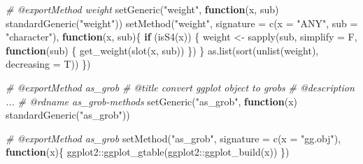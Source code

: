 \documentclass[
]{article}
\newenvironment{Shaded}{\begin{snugshade}}{\end{snugshade}}
\newcommand{\AttributeTok}[1]{\textcolor[rgb]{0.77,0.63,0.00}{#1}}
\newcommand{\CommentTok}[1]{\textcolor[rgb]{0.56,0.35,0.01}{\textit{#1}}}
\newcommand{\ControlFlowTok}[1]{\textcolor[rgb]{0.13,0.29,0.53}{\textbf{#1}}}
\newcommand{\FunctionTok}[1]{\textcolor[rgb]{0.00,0.00,0.00}{#1}}
\newcommand{\NormalTok}[1]{#1}
\newcommand{\OtherTok}[1]{\textcolor[rgb]{0.56,0.35,0.01}{#1}}
\newcommand{\SpecialCharTok}[1]{\textcolor[rgb]{0.00,0.00,0.00}{#1}}
\newcommand{\StringTok}[1]{\textcolor[rgb]{0.31,0.60,0.02}{#1}}
\begin{document}
\begin{Shaded}
\begin{Highlighting}[]
\CommentTok{\#\textquotesingle{} @exportMethod weight}
\FunctionTok{setGeneric}\NormalTok{(}\StringTok{"weight"}\NormalTok{, }
  \ControlFlowTok{function}\NormalTok{(x, sub) }\FunctionTok{standardGeneric}\NormalTok{(}\StringTok{"weight"}\NormalTok{))}
\FunctionTok{setMethod}\NormalTok{(}\StringTok{"weight"}\NormalTok{, }
  \AttributeTok{signature =} \FunctionTok{c}\NormalTok{(}\AttributeTok{x =} \StringTok{"ANY"}\NormalTok{, }\AttributeTok{sub =} \StringTok{"character"}\NormalTok{),}
  \ControlFlowTok{function}\NormalTok{(x, sub)\{}
    \ControlFlowTok{if}\NormalTok{ (}\FunctionTok{isS4}\NormalTok{(x)) \{}
\NormalTok{      weight }\OtherTok{\textless{}{-}}
        \FunctionTok{sapply}\NormalTok{(sub, }\AttributeTok{simplify =}\NormalTok{ F, }\ControlFlowTok{function}\NormalTok{(sub) \{}
          \FunctionTok{get\_weight}\NormalTok{(}\FunctionTok{slot}\NormalTok{(x, sub))}
\NormalTok{      \})}
\NormalTok{    \}}
    \FunctionTok{as.list}\NormalTok{(}\FunctionTok{sort}\NormalTok{(}\FunctionTok{unlist}\NormalTok{(weight), }\AttributeTok{decreasing =}\NormalTok{ T))}
\NormalTok{  \})}

\CommentTok{\#\textquotesingle{} @exportMethod as\_grob}
\CommentTok{\#\textquotesingle{} @title convert \textquotesingle{}ggplot\textquotesingle{} object to \textquotesingle{}grobs\textquotesingle{}}
\CommentTok{\#\textquotesingle{} @description ...}
\CommentTok{\#\textquotesingle{} @rdname as\_grob{-}methods}
\FunctionTok{setGeneric}\NormalTok{(}\StringTok{"as\_grob"}\NormalTok{,}
  \ControlFlowTok{function}\NormalTok{(x) }\FunctionTok{standardGeneric}\NormalTok{(}\StringTok{"as\_grob"}\NormalTok{))}

\CommentTok{\#\textquotesingle{} @exportMethod as\_grob}
\FunctionTok{setMethod}\NormalTok{(}\StringTok{"as\_grob"}\NormalTok{, }
  \AttributeTok{signature =} \FunctionTok{c}\NormalTok{(}\AttributeTok{x =} \StringTok{"gg.obj"}\NormalTok{),}
  \ControlFlowTok{function}\NormalTok{(x)\{}
\NormalTok{    ggplot2}\SpecialCharTok{::}\FunctionTok{ggplot\_gtable}\NormalTok{(ggplot2}\SpecialCharTok{::}\FunctionTok{ggplot\_build}\NormalTok{(x))}
\NormalTok{  \})}


\end{Highlighting}
\end{Shaded}
\end{document}
